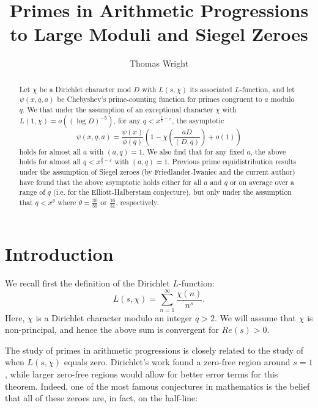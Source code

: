 \documentclass{amsart}
\begin{document}
\title{Primes in Arithmetic Progressions to Large Moduli and Siegel Zeroes}
\author[T. Wright]{Thomas Wright}
\address{Wofford College\\429 N. Church St.\\Spartanburg, SC 29302\\USA}
\maketitle



\begin{abstract}
Let $\chi$ be a Dirichlet character mod $D$ with $L(s,\chi)$ its associated $L$-function, and let $\psi(x,q,a)$ be Chebyshev's prime-counting function for primes congruent to $a$ modulo $q$.  We that under the assumption of an exceptional character $\chi$ with $L(1,\chi)=o\left((\log D)^{-5}\right)$, for any $q<x^{\frac 23-\varepsilon}$, the asymptotic
$$\psi(x,q,a)=\frac{\psi(x)}{\phi(q)}\left(1-\chi\left(\frac{aD}{(D,q)}\right)+o(1)\right)$$
holds for almost all $a$ with $(a,q)=1$.  We also find that for any fixed $a$, the above holds for almost all $q<x^{\frac 23-\varepsilon}$ with $(a,q)=1$.
Previous prime equidistribution results under the assumption of Siegel zeroes (by Friedlander-Iwaniec and the current author) have found that the above asymptotic holds either for all $a$ and $q$ or on average over a range of $q$ (i.e. for the Elliott-Halberstam conjecture), but only under the assumption that $q<x^{\theta}$ where $\theta=\frac{30}{59}$ or $\frac{16}{31}$, respectively.
\end{abstract}

\section{Introduction}

We recall first the definition of the Dirichlet $L$-function:
$$L(s,\chi)=\sum_{n=1}^\infty \frac{\chi(n)}{n^s}.$$
Here, $\chi$ is a Dirichlet character modulo an integer $q>2$.  We will assume that $\chi$ is non-principal, and hence the above sum is convergent for $Re(s)>0$.

The study of primes in arithmetic progressions is closely related to the study of when $L(s,\chi)$ equals zero.  Dirichlet's work found a zero-free region around $s=1$, while larger zero-free regions would allow for better error terms for this theorem.  Indeed, one of the most famous conjectures in mathematics is the belief that all of these zeroes are, in fact, on the half-line:
\end{document}
